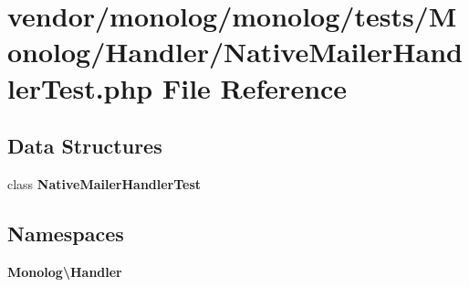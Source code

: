 \section{vendor/monolog/monolog/tests/\+Monolog/\+Handler/\+Native\+Mailer\+Handler\+Test.php File Reference}
\label{_native_mailer_handler_test_8php}
\subsection*{Data Structures}
\begin{DoxyCompactItemize}
\item 
class {\bf Native\+Mailer\+Handler\+Test}
\end{DoxyCompactItemize}
\subsection*{Namespaces}
\begin{DoxyCompactItemize}
\item 
 {\bf Monolog\textbackslash{}\+Handler}
\end{DoxyCompactItemize}
